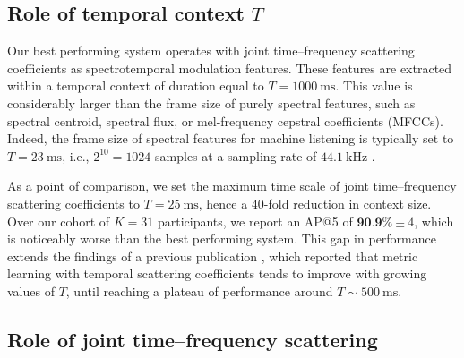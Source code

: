 \documentclass{bmcart}
\begin{document}
\subsection*{Role of temporal context $T$}

Our best performing system operates with joint time--frequency scattering coefficients as spectrotemporal modulation features.
These features are extracted within a temporal context of duration equal to $T=\SI{1000}{\milli\second}$.
This value is considerably larger than the frame size of purely spectral features, such as spectral centroid, spectral flux, or mel-frequency cepstral coefficients (MFCCs).
Indeed, the frame size of spectral features for machine listening is typically set to $T=\SI{23}{\milli\second}$, i.e., $2^{10}=1024$ samples at a sampling rate of $\SI{44,1}{\kilo\hertz}$ \cite{brown1999jasa,eronen2000icassp}.

As a point of comparison, we set the maximum time scale of joint time--frequency scattering coefficients to $T=\SI{25}{\milli\second}$, hence a $40$-fold reduction in context size.
Over our cohort of $K=31$ participants, we report an AP@5 of $\textbf{90.9\%} \pm 4$, which is noticeably worse than the best performing system.
This gap in performance extends the findings of a previous publication \cite{lostanlen2018extended}, which reported that metric learning with temporal scattering coefficients tends to improve with growing values of $T$, until reaching a plateau of performance around $T\sim\SI{500}{\milli\second}$.


\subsection*{Role of joint time--frequency scattering}
\end{document}
